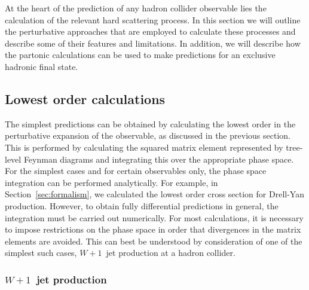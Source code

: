 \documentclass[12pt]{iopart}
\begin{document}
At the heart of the prediction of any hadron collider observable lies the
calculation of the relevant hard scattering process. In this section we will
outline the perturbative approaches that are employed to calculate these processes
and describe some of their features and limitations. In addition, we will describe
how the partonic calculations can be used to make predictions for an exclusive
hadronic final state.

\subsection{Lowest order calculations}
\label{sec:localcs}

The simplest predictions can be obtained by calculating the lowest order in the perturbative
expansion of the observable, as discussed in the previous section.  This is performed by
calculating the squared matrix element represented by tree-level Feynman diagrams and
integrating this over the appropriate phase space.  For the simplest cases and for certain
observables only, the phase space integration can be performed analytically. For example, in
Section~\ref{sec:formalism}, we calculated the lowest order cross section for Drell-Yan production. However, to
obtain fully differential predictions in general, the integration must be carried out
numerically. For most calculations, it is necessary to impose restrictions on the phase space
in order that divergences in the matrix elements are avoided.  This can best be understood by
consideration of one of the simplest such cases, $W+1$~jet production at a hadron collider.

\subsubsection{$W+1$~jet production}
\label{sec:w1j}
\end{document}
